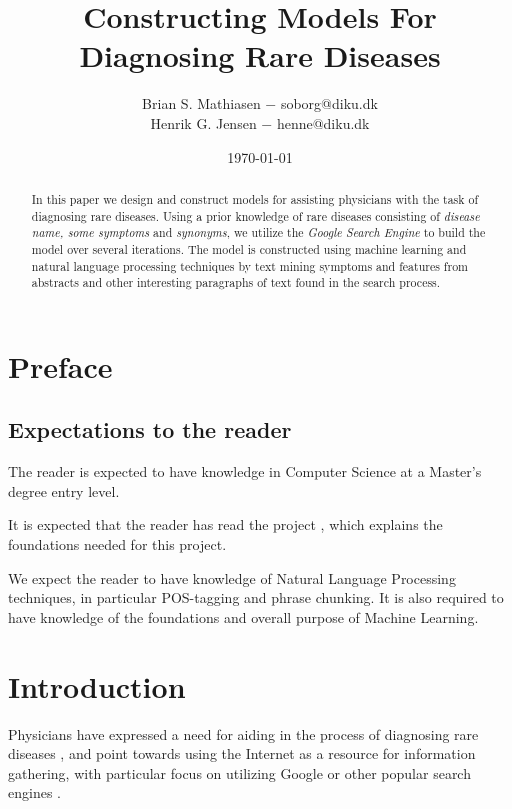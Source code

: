\documentclass[10pt,letterpaper,final]{article}
\title{Constructing Models For Diagnosing Rare Diseases}
\author{Brian S. Mathiasen $-$ soborg@diku.dk \\
        Henrik G. Jensen $-$ henne@diku.dk\\
}
\date{\today} %
\begin{document}
\maketitle
\listoffixmes


\begin{abstract}
In this paper we design and construct models for assisting physicians
with the task of diagnosing rare diseases. Using a prior knowledge of
rare diseases consisting of \textit{disease name, some symptoms} and
\textit{synonyms}, we utilize the \textit{Google Search Engine} to build
the model over several iterations. The model is constructed using
machine learning and natural language processing techniques by text
mining symptoms and features from abstracts and other interesting
paragraphs of text found in the search process.

\end{abstract}

\section{Preface}
\subsection{Expectations to the reader}
The reader is expected to have knowledge in Computer Science at a
Master's degree entry level.

It is expected that the reader has read the project
\cite{jensenandersen}, which explains the foundations needed for this
project.

We expect the reader to have knowledge of Natural Language Processing
techniques, in particular POS-tagging and phrase chunking. It is also
required to have knowledge of the foundations and overall purpose of
Machine Learning.


\section{Introduction}
Physicians have expressed a need for aiding in the process of diagnosing
rare diseases \cite{googlingdiagnosis}, and point towards using the
Internet as a resource for information gathering, with particular focus
on utilizing Google or other popular search engines
\cite{googlechangemedicine} \cite{diagnosissearchengines}.

\end{document}
